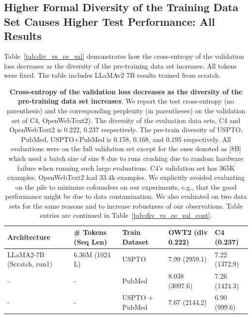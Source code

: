 \subsection{Higher Formal Diversity of the Training Data Set Causes Higher Test Performance: All Results}
Table~\ref{tab:div_vs_ce_val} demonstrates how the cross-entropy of the validation loss decreases as the diversity of the pre-training data set increases. 
All tokens were fixed. 
The table includes LLaMAv2 7B results trained from scratch.

\begin{table}[h]
\caption{\textbf{Cross-entropy of the validation loss decreases as the diversity of the pre-training data set increases}. 
We report the test cross-entropy (no parenthesis) and the corresponding perplexity (in parentheses) on the validation set of C4, OpenWebText2).
The diversity of the evaluation data sets, C4 and OpenWebText2 is 0.222, 0.237 respectively. 
The pre-train diversity of USPTO, PubMed, USPTO+PubMed is 0.158, 0.168, and 0.195 respectively.
All evaluations were on the full validation set except for the ones denoted as [8B] which used a batch size of size 8 due to runs crashing due to random hardware failure when running such large evaluations. 
C4's validation set has 365K examples. 
OpenWebText2 had 33.4k examples. 
We explicitly avoided evaluating on the pile to minimize cofounders on our experiments, e.g., that the good performance might be due to data contamination. 
We also evaluated on two data sets for the same reasons and to increase robustness of our observations. Table entries are continued in Table~\ref{tab:div_vs_ce_val_cont}.
}
\vspace{10pt}
\centering
\begin{tabularx}{1\textwidth}{lXXXX} 
\bottomrule 
Architecture & \# Tokens (Seq Len) & Train Dataset  & OWT2 (\textbf{div 0.222})  & C4 (\textbf{0.237}) \\
\bottomrule 

LLaMA2-7B (Scratch, run1) & 6.36M (1024 L) & USPTO  & 7.99 (2959.1) & 7.22 (1372.9) \\ %
- & - & PubMed & 8.038 (3097.6) & 7.26 (1424.3) \\ %
- & - & USPTO + PubMed & 7.67 (2144.2) & 6.90 (999.6) \\ %
\hline


\end{tabularx}
\end{table}
